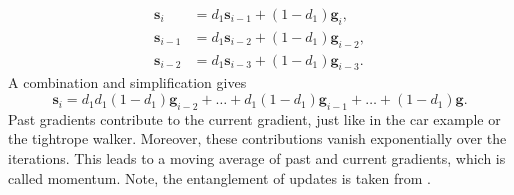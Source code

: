 \begin{align}
	\mathbf{s}_i &= d_1\mathbf{s}_{i-1}+(1-d_1)\mathbf{g}_{i}\mathrm{,} \label{Eq: fm}\\
	\mathbf{s}_{i-1}&=d_1\mathbf{s}_{i-2}+(1-d_1)\mathbf{g}_{i-2}\mathrm{,}\\
	\mathbf{s}_{i-2}&=d_1\mathbf{s}_{i-3}+(1-d_1)\mathbf{g}_{i-3}\mathrm{.}
\end{align}
A combination and simplification gives
\begin{equation}
	\mathbf{s}_i = d_1d_1(1-d_1)\mathbf{g}_{i-2}+\dots+d_1(1-d_1)\mathbf{g}_{i-1}+\dots+(1-d_1)\mathbf{g}\mathrm{.}
\end{equation}
Past gradients contribute to the current gradient, just like in the car example or the tightrope walker. Moreover, these contributions vanish exponentially over the iterations. This leads to a moving average of past and current gradients, which is called momentum. Note, the entanglement of updates is taken from \cite{bushaev_2017}. 

